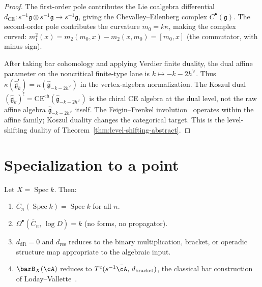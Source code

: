 \begin{proof}
The first-order pole contributes the Lie coalgebra differential
$d_{\mathrm{CE}}\colon s^{-1}\mathfrak{g} \otimes
s^{-1}\mathfrak{g} \to s^{-1}\mathfrak{g}$, giving the
Chevalley--Eilenberg complex $C^\bullet(\mathfrak{g})$. The
second-order pole contributes the curvature $m_0 = k\kappa$, making
the complex curved: $m_1^2(x) = m_2(m_0, x) - m_2(x, m_0) =
[m_0, x]$ (the commutator, with minus sign).

After taking bar cohomology and applying Verdier finite duality, the
dual affine parameter on the noncritical finite-type lane is
$k \mapsto -k - 2h^\vee$. Thus
$\kappa(\widehat{\mathfrak{g}}_k^!)
= \kappa(\widehat{\mathfrak{g}}_{-k-2h^\vee})$ in the vertex-algebra
normalization. The Koszul dual
$(\widehat{\mathfrak{g}}_k)^!
= \mathrm{CE}^{\mathrm{ch}}(\widehat{\mathfrak{g}}_{-k-2h^\vee})$
is the chiral CE algebra at the dual level, not the raw affine
algebra $\widehat{\mathfrak{g}}_{-k-2h^\vee}$ itself. The
Feigin--Frenkel involution~\cite{Feigin-Frenkel} operates within the
affine family; Koszul duality changes the categorical target.
This is the level-shifting duality of
Theorem~\ref{thm:level-shifting-abstract}.
\end{proof}


\section{Specialization to a point}\label{sec:fourier-specialization}

\begin{theorem}
\label{thm:fourier-specialization}
Let $X = \operatorname{Spec} k$. Then:
\begin{enumerate}
\item $\overline{C}_n(\operatorname{Spec} k) = \operatorname{Spec} k$
 for all $n$.
\item $\Omega^\bullet(\overline{C}_n,\, \log D) = k$ (no forms, no
 propagator).
\item $d_{\mathrm{dR}} = 0$ and $d_{\mathrm{res}}$ reduces to the
 binary multiplication, bracket, or operadic structure map appropriate
 to the algebraic input.
\item $\barB_X(\cA)$ reduces to
 $T^c(s^{-1}\bar{\cA},\, d_{\mathrm{bracket}})$, the classical bar
 construction of Loday--Vallette~\cite[\S2.2]{LV12}.
\end{enumerate}
\end{theorem}

